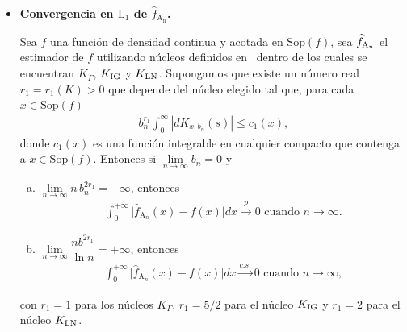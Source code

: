 \begin{itemize}


\item \textbf{Convergencia en $\text{L}_1$ de $\widehat{f}_{\text{A}_\text{n}}$.}

\begin{theorem}
	\label{ConvergenciaFuerte}
	\bigskip
	Sea $f$ una función de densidad continua y acotada en $\mathrm{Sop}(f)$, sea $\widehat{f}_{\tiny \text{A}_n}$ el estimador de $f$ utilizando núcleos definidos en~\cite{Libnegue2013} dentro de los cuales se encuentran $K_{\Gamma}$, $K_{\tiny \text{IG}}$ y $K_{\tiny \text{LN}}$. Supongamos que existe un número real $r_1=r_1(K)>0$ que depende del núcleo elegido tal que, para cada $x \in \mathrm{Sop}(f)$ 
	\begin{align}
	b_n^{r_1} \displaystyle{\int_0^{\infty}} | dK_{x,b_n}(s) | \leq c_1(x),
	\end{align}
	donde $c_1(x)$ es una función integrable en cualquier compacto que contenga a $x \in \mathrm{Sop}(f)$. Entonces si $\lim\limits_{n \rightarrow \infty} b_n=0 $ y
	\begin{enumerate}[a)]
		\item $\lim\limits_{n \rightarrow \infty} n \, b_n^{2r_1}=+\infty$,  entonces
		\begin{align}
		\int_0^{+\infty} \vert \widehat{f}_{\text{A}_n}(x)-f(x)\vert dx \stackrel{p} {\longrightarrow} 0 \text{ cuando } n \longrightarrow \infty.
		\label{L1debil}
		\end{align}
		\item $\lim\limits_{n \to \infty} \dfrac{n b^{2r_1}}{\ln{n}}  = +\infty $, entonces 
		\begin{align}
		\int_0^{+\infty} \vert \widehat{f}_{\text{A}_n}(x)-f(x)\vert dx \stackrel{c.s.} {\longrightarrow} 0 \text{ cuando } n \longrightarrow \infty,
		\label{L1fuerte}
		\end{align}
	\end{enumerate}
	con $r_1=1$ para los núcleos $K_{\Gamma}$, $r_1=5/2$ para el núcleo $K_{\tiny \text{IG}}$ y $r_1=2$ para el núcleo $K_{\tiny \text{LN}}$.
\end{theorem}




\end{itemize}
